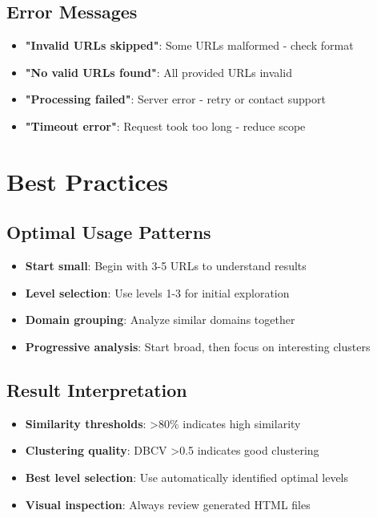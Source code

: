\subsection{Error Messages}
\label{subsec:error-messages}

\begin{itemize}
    \item \textbf{"Invalid URLs skipped"}: Some URLs malformed - check format
    \item \textbf{"No valid URLs found"}: All provided URLs invalid
    \item \textbf{"Processing failed"}: Server error - retry or contact support
    \item \textbf{"Timeout error"}: Request took too long - reduce scope
\end{itemize}

\section{Best Practices}
\label{sec:best-practices}

\subsection{Optimal Usage Patterns}
\label{subsec:optimal-usage}

\begin{itemize}
    \item \textbf{Start small}: Begin with 3-5 URLs to understand results
    \item \textbf{Level selection}: Use levels 1-3 for initial exploration
    \item \textbf{Domain grouping}: Analyze similar domains together
    \item \textbf{Progressive analysis}: Start broad, then focus on interesting clusters
\end{itemize}

\subsection{Result Interpretation}
\label{subsec:result-interpretation}

\begin{itemize}
    \item \textbf{Similarity thresholds}: >80\% indicates high similarity
    \item \textbf{Clustering quality}: DBCV >0.5 indicates good clustering
    \item \textbf{Best level selection}: Use automatically identified optimal levels
    \item \textbf{Visual inspection}: Always review generated HTML files
\end{itemize} 